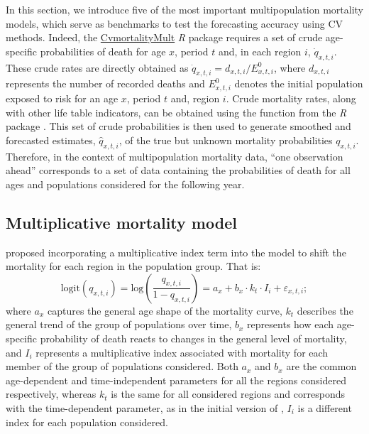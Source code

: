 In this section, we introduce five of the most important multipopulation mortality models, which serve as benchmarks to test the forecasting accuracy using CV methods. Indeed, the \href{https://cran.r-project.org/web/packages/CvmortalityMult/index.html}{CvmortalityMult} \emph{R} package requires a set of crude age-specific probabilities of death for age $x$, period $t$ and, in each region $i$, $\dot{q}_{x,t,i}$. These crude rates are directly obtained as $\dot{q}_{x,t,i}=d_{x,t,i}/E^{0}_{x,t,i}$, where $d_{x,t,i}$ represents the number of recorded deaths and $E^0_{x,t,i}$ denotes the initial population exposed to risk for an age $x$, period $t$ and, region $i$. Crude mortality rates, along with other life table indicators, can be obtained using the  function from the  \emph{R} package \citep{Pascariu2022}. This set of crude probabilities is then used to generate smoothed and forecasted estimates, $\hat{q}_{x,t,i}$, of the true but unknown mortality probabilities $q_{x,t,i}$. Therefore, in the context of multipopulation mortality data, ``one observation ahead'' corresponds to a set of data containing the probabilities of death for all ages and populations considered for the following year.

\subsection{Multiplicative mortality model}

\citet{Russolillo2011} proposed incorporating a multiplicative index term into the \citet{Lee1992} model to shift the mortality for each region in the population group. That is:
\begin{equation}
\textrm{logit}\left(q_{x,t,i} \right)=\textrm{log}\left(\frac{q_{x,t,i}}{1-q_{x,t,i}}\right)=a_x + b_x \cdot k_t \cdot I_i + \varepsilon_{x,t,i};
\label{EQ_ruso}
\end{equation}
where $a_x$ captures the general age shape of the mortality curve, $k_t$ describes the general trend of the group of populations over time, $b_x$ represents how each age-specific probability of death reacts to changes in the general level of mortality, and $I_i$ represents a multiplicative index associated with mortality for each member of the group of populations considered. Both $a_x$ and $b_x$ are the common age-dependent and time-independent parameters for all the regions considered respectively,  whereas $k_t$ is the same for all considered regions and corresponds with the time-dependent parameter, as in the initial version of \citet{Lee1992}, $I_i$ is a different index for each population considered.

